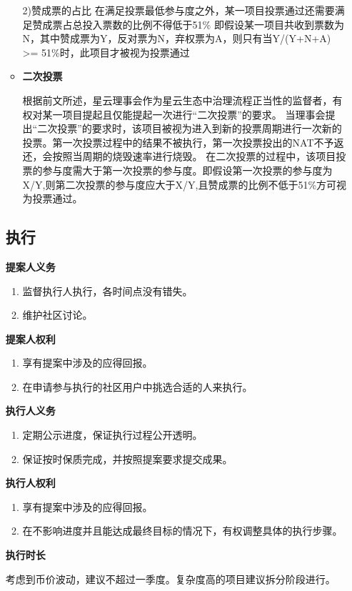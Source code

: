 \begin{enumerate}
\begin{itemize}
	2)赞成票的占比
	在满足投票最低参与度之外，某一项目投票通过还需要满足赞成票占总投入票数的比例不得低于51\%
	即假设某一项目共收到票数为N，其中赞成票为Y，反对票为N，弃权票为A，则只有当Y/(Y+N+A) >= 51\%时，此项目才被视为投票通过

	\item \textbf{二次投票}
	
	根据前文所述，星云理事会作为星云生态中治理流程正当性的监督者，有权对某一项目提起且仅能提起一次进行“二次投票”的要求。
	当理事会提出“二次投票”的要求时，该项目被视为进入到新的投票周期进行一次新的投票。第一次投票过程中的结果不被执行，第一次投票投出的NAT不予返还，会按照当周期的烧毁速率进行烧毁。
	在二次投票的过程中，该项目投票的参与度需大于第一次投票的参与度。即假设第一次投票的参与度为X/Y,则第二次投票的参与度应大于X/Y,且赞成票的比例不低于51\%方可视为投票通过。
	
\end{itemize}

\subsection{执行}
\textbf{提案人义务}
\begin{enumerate}
\item 监督执行人执行，各时间点没有错失。
\item 维护社区讨论。
\end{enumerate}

\textbf{提案人权利}
\begin{enumerate}
\item 享有提案中涉及的应得回报。
\item 在申请参与执行的社区用户中挑选合适的人来执行。
\end{enumerate}

\textbf{执行人义务}
\begin{enumerate}
\item 定期公示进度，保证执行过程公开透明。
\item 保证按时保质完成，并按照提案要求提交成果。
\end{enumerate}

\textbf{执行人权利}
\begin{enumerate}
\item 享有提案中涉及的应得回报。
\item 在不影响进度并且能达成最终目标的情况下，有权调整具体的执行步骤。
\end{enumerate}

\textbf{执行时长}

考虑到币价波动，建议不超过一季度。复杂度高的项目建议拆分阶段进行。


\end{enumerate}
